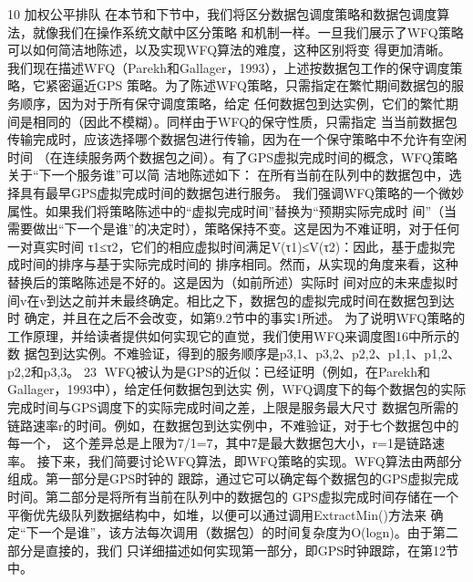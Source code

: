 10 加权公平排队
在本节和下节中，我们将区分数据包调度策略和数据包调度算法，就像我们在操作系统文献中区分策略
和机制一样。一旦我们展示了WFQ策略可以如何简洁地陈述，以及实现WFQ算法的难度，这种区别将变
得更加清晰。
我们现在描述WFQ（Parekh和Gallager，1993），上述按数据包工作的保守调度策略，它紧密逼近GPS
策略。为了陈述WFQ策略，只需指定在繁忙期间数据包的服务顺序，因为对于所有保守调度策略，给定
任何数据包到达实例，它们的繁忙期间是相同的（因此不模糊）。同样由于WFQ的保守性质，只需指定
当当前数据包传输完成时，应该选择哪个数据包进行传输，因为在一个保守策略中不允许有空闲时间
（在连续服务两个数据包之间）。有了GPS虚拟完成时间的概念，WFQ策略关于“下一个服务谁”可以简
洁地陈述如下：
在所有当前在队列中的数据包中，选择具有最早GPS虚拟完成时间的数据包进行服务。
我们强调WFQ策略的一个微妙属性。如果我们将策略陈述中的“虚拟完成时间”替换为“预期实际完成时
间”（当需要做出“下一个是谁”的决定时），策略保持不变。这是因为不难证明，对于任何一对真实时间
τ1≤τ2，它们的相应虚拟时间满足V(τ1)≤V(τ2)：因此，基于虚拟完成时间的排序与基于实际完成时间的
排序相同。然而，从实现的角度来看，这种替换后的策略陈述是不好的。这是因为（如前所述）实际时
间对应的未来虚拟时间v在v到达之前并未最终确定。相比之下，数据包的虚拟完成时间在数据包到达时
确定，并且在之后不会改变，如第9.2节中的事实1所述。
为了说明WFQ策略的工作原理，并给读者提供如何实现它的直觉，我们使用WFQ来调度图16中所示的数
据包到达实例。不难验证，得到的服务顺序是p3,1、p3,2、p2,2、p1,1、p1,2、p2,2和p3,3。
                                                      23
WFQ被认为是GPS的近似：已经证明（例如，在Parekh和Gallager，1993中），给定任何数据包到达实
例，WFQ调度下的每个数据包的实际完成时间与GPS调度下的实际完成时间之差，上限是服务最大尺寸
数据包所需的链路速率r的时间。例如，在数据包到达实例中，不难验证，对于七个数据包中的每一个，
这个差异总是上限为7/1=7，其中7是最大数据包大小，r=1是链路速率。
接下来，我们简要讨论WFQ算法，即WFQ策略的实现。WFQ算法由两部分组成。第一部分是GPS时钟的
跟踪，通过它可以确定每个数据包的GPS虚拟完成时间。第二部分是将所有当前在队列中的数据包的
GPS虚拟完成时间存储在一个平衡优先级队列数据结构中，如堆，以便可以通过调用ExtractMin()方法来
确定“下一个是谁”，该方法每次调用（数据包）的时间复杂度为O(logn)。由于第二部分是直接的，我们
只详细描述如何实现第一部分，即GPS时钟跟踪，在第12节中。

